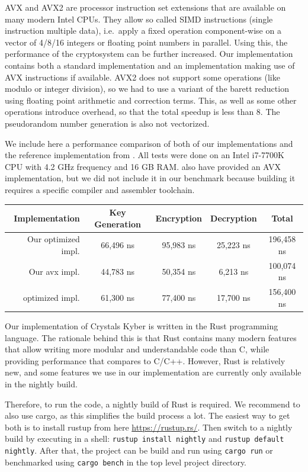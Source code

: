 \documentclass{report}
\newcommand{\code}[1]{\texttt{#1}}
\begin{document}
\remark[AVX]
AVX and AVX2 are processor instruction set extensions that are available on many modern Intel CPUs. They allow so called SIMD instructions (single instruction multiple data), i.e.\ apply a fixed operation component-wise on a vector of 4/8/16 integers or floating point numbers in parallel. Using this, the performance of the cryptosystem can be further increased. Our implementation contains both a standard implementation and an implementation making use of AVX instructions if available. AVX2 does not support some operations (like modulo or integer division), so we had to use a variant of the barett reduction using floating point arithmetic and correction terms. This, as well as some other operations introduce overhead, so that the total speedup is less than 8. The pseudorandom number generation is also not vectorized.

\tocremark[Performance]
\label{performance}
We include here a performance comparison of both of our implementations and the reference implementation from \cite{NistirFstRound}. All tests were done on an Intel i7-7700K CPU with 4.2 GHz frequency and 16 GB RAM. \cite{NistirFstRound} also have provided an AVX implementation, but we did not include it in our benchmark because building it requires a specific compiler and assembler toolchain.
\begin{center}
\centering
\begin{tabular}{ r c c c c }
\hline
Implementation & Key Generation & Encryption & Decryption & Total \\
\hline
Our optimized impl. & 66,496 ns & 95,983 ns & 25,223 ns & 196,458 ns \\
Our avx impl. & 44,783 ns & 50,354 ns & 6,213 ns & 100,074 ns \\
\cite{NistirFstRound} optimized impl. & 61,300 ns & 77,400 ns & 17,700 ns & 156,400 ns \\
\hline
\end{tabular}
\end{center}

Our implementation of Crystals Kyber is written in the Rust programming language. The rationale behind this is that Rust contains many modern features that allow writing more modular and understandable code than C, while providing performance that compares to C/C++. However, Rust is relatively new, and some features we use in our implementation are currently only available in the nightly build.

Therefore, to run the code, a nightly build of Rust is required. We recommend to also use cargo, as this simplifies the build process a lot. The easiest way to get both is to install rustup from here \url{https://rustup.rs/}. Then switch to a nightly build by executing in a shell: \code{rustup install nightly} and \code{rustup default nightly}. After that, the project can be build and run using \code{cargo run} or benchmarked using \code{cargo bench} in the top level project directory.
\end{document}
